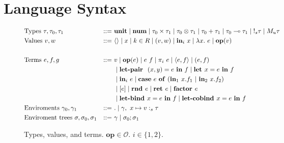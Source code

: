 \section{Language Syntax}

\begin{figure}[tbp]
  \begin{alignat*}{3}
         &\text{Types } \tau, \tau_0, \tau_1 &::=~ &\mathbf{unit}
         \mid \textbf{num}
         \mid \tau_0 \times \tau_1
         \mid \tau_0 \otimes \tau_1
         \mid \tau_0 + \tau_1
         \mid \tau_0 \multimap \tau_1
         \mid {{!_{s}} \tau}
         \mid {M_u \tau}
         \\
         &\text{Values } v, w \ &::=~ &\langle \rangle
         \mid x
         \mid k \in R
         \mid (v, w)
         \mid \textbf{in}_i \ x
         \mid \lambda x.~e
         \mid \mathbf{op}(v) \\
         \\
         &\text{Terms } e, f, g &::=~ &v
         \mid \mathbf{op}(e)
         \mid e~f
         \mid {\pi}_i\ e
         \mid \langle e,f \rangle 
         \mid (e, f) \\
         & & & \mid \textbf{let-pair } \ (x,y) = e \ \textbf{in} \ f
         \mid \textbf{let } x  = e \ \textbf{in} \ f \\
         & & & \mid \textbf{in}_i \ e
         \mid 
          \mathbf{case} \ e \ \mathbf{of} \ (\textbf{in}_1 \ x.f_1 \ | \ \textbf{in}_2 \ x.f_2) \\
         & & &
         \mid [e]
         \mid \textbf{rnd } e
         \mid {\textbf{ret }e} 
         \mid \textbf{factor } e \\
         & & & 
         \mid {\textbf{let-bind }x = e \ \textbf{in}\ f}
         \mid \textbf{let-cobind } x = e \ \textbf{in} \ f
         \\
         &\text{Enviroments } \gamma_0, \gamma_1 &::=~ &.
         \mid \gamma, \ x \mapsto v :_s \tau \\
         &\text{Enviroment trees } \sigma, \sigma_0, \sigma_1 &::=~ & \gamma
         \mid \sigma_0; \sigma_1
  \end{alignat*}
  \caption{
    Types, values, and terms. 
    $\mathbf{op} \in \mathcal{O}$.
    $i \in \{1, 2\}$. 
  }
  \label{fig:syntax}
\end{figure}


